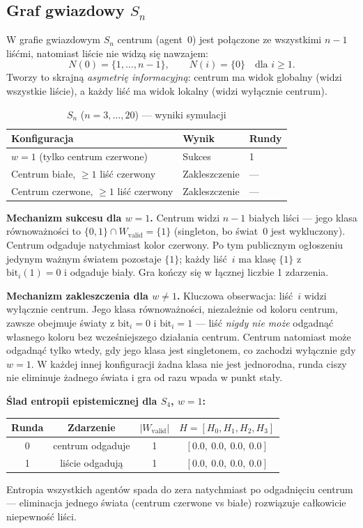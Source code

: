 \documentclass[12pt,a4paper]{article}
\theoremstyle{plain}
\theoremstyle{definition}
\theoremstyle{remark}
\newcommand{\Wval}{W_{\mathrm{valid}}}
\begin{document}
\subsection{Graf gwiazdowy $S_n$}

W grafie gwiazdowym $S_n$ centrum (agent~0) jest połączone ze wszystkimi $n{-}1$ liśćmi, natomiast liście nie widzą się nawzajem:
$$N(0) = \{1,\ldots,n{-}1\}, \qquad N(i) = \{0\} \quad \text{dla } i \ge 1.$$
Tworzy to skrajną \emph{asymetrię informacyjną}: centrum ma widok globalny (widzi wszystkie liście), a każdy liść ma widok lokalny (widzi wyłącznie centrum).

\begin{table}[h]
\centering
\caption{$S_n$ ($n = 3,\ldots,20$) — wyniki symulacji}
\begin{tabular}{lll}
\toprule
Konfiguracja & Wynik & Rundy \\
\midrule
$w = 1$ (tylko centrum czerwone) & Sukces & 1 \\
Centrum białe, $\ge 1$ liść czerwony & Zakleszczenie & — \\
Centrum czerwone, $\ge 1$ liść czerwony & Zakleszczenie & — \\
\bottomrule
\end{tabular}
\end{table}

\textbf{Mechanizm sukcesu dla $w = 1$.}
Centrum widzi $n{-}1$ białych liści — jego klasa równoważności to $\{0, 1\} \cap \Wval = \{1\}$ (singleton, bo świat~0 jest wykluczony). Centrum odgaduje natychmiast kolor czerwony. Po tym publicznym ogłoszeniu jedynym ważnym światem pozostaje $\{1\}$; każdy liść~$i$ ma klasę $\{1\}$ z $\mathrm{bit}_i(1) = 0$ i odgaduje biały. Gra kończy się w łącznej liczbie 1 zdarzenia.

\textbf{Mechanizm zakleszczenia dla $w \ne 1$.}
Kluczowa obserwacja: liść~$i$ widzi wyłącznie centrum. Jego klasa równoważności, niezależnie od koloru centrum, zawsze obejmuje światy z $\mathrm{bit}_i = 0$ i $\mathrm{bit}_i = 1$ — liść \emph{nigdy nie może} odgadnąć własnego koloru bez wcześniejszego działania centrum. Centrum natomiast może odgadnąć tylko wtedy, gdy jego klasa jest singletonem, co zachodzi wyłącznie gdy $w = 1$. W każdej innej konfiguracji żadna klasa nie jest jednorodna, runda ciszy nie eliminuje żadnego świata i gra od razu wpada w punkt stały.

\textbf{Ślad entropii epistemicznej dla $S_4$, $w = 1$:}
\begin{center}
\begin{tabular}{cccc}
\toprule
Runda & Zdarzenie & $|\Wval|$ & $H = [H_0, H_1, H_2, H_3]$ \\
\midrule
0 & centrum odgaduje & 1 & $[0.0,\ 0.0,\ 0.0,\ 0.0]$ \\
1 & liście odgadują & 1 & $[0.0,\ 0.0,\ 0.0,\ 0.0]$ \\
\bottomrule
\end{tabular}
\end{center}
Entropia wszystkich agentów spada do zera natychmiast po odgadnięciu centrum — eliminacja jednego świata (centrum czerwone vs białe) rozwiązuje całkowicie niepewność liści.
\end{document}
